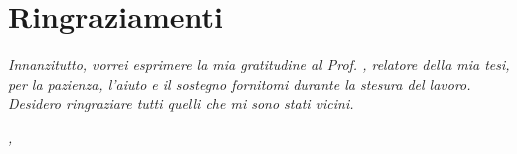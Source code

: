 \cleardoublepage
{}
{}



\bigskip

\begingroup
\let\clearpage\relax
\let\cleardoublepage\relax
\let\cleardoublepage\relax

\chapter*{Ringraziamenti}

\noindent \textit{Innanzitutto, vorrei esprimere la mia gratitudine al Prof. \myProf, relatore della mia tesi, per la pazienza, l'aiuto e il sostegno fornitomi durante la stesura del lavoro.}\\

\noindent \textit{Desidero ringraziare tutti quelli che mi sono stati vicini.}\\

\bigskip

\noindent\textit{\myLocation, \myTime}
\hfill \myName

\endgroup
